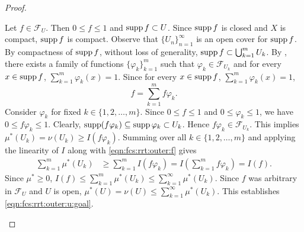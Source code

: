 \begin{proof}
\begin{step}
Let $f \in \mathcal{F}_U$. Then $0 \leq f \leq 1$ and $\operatorname{supp} f \subset U$. Since $\operatorname{supp} f$ is closed and $X$ is compact, $\operatorname{supp} f$ is compact. Observe that $\{ U_n \}_{n = 1}^{\infty}$ is an open cover for $\operatorname{supp} f$. By compactness of $\operatorname{supp} f$, without loss of generality, $\operatorname{supp} f \subset \bigcup_{k=1}^m U_k$.
By , there exists a family of functions $\{ \varphi_k \}_{k=1}^m$ such that $\varphi_k \in \mathcal{F}_{U_k}$ and for every $x \in \operatorname{supp} f$, $\sum_{k=1}^m \varphi_k(x) = 1$. 
Since for every $x \in \operatorname{supp} f$, $\sum_{k=1}^m \varphi_k(x) = 1$, \begin{equation}
    \label{eqn:fcs:rrt:outer:f}
    f = \sum_{k=1}^m f \varphi_k.
\end{equation}
Consider $\varphi_k$ for fixed $k \in \{ 1, 2, \ldots, m \}$.
Since $0 \leq f \leq 1$ and $0 \leq \varphi_k \leq 1$, we have $0 \leq f \varphi_k \leq 1$.
Clearly, $\operatorname{supp}(f \varphi_k) \subseteq \operatorname{supp} \varphi_k \subset U_k$. Hence $f \varphi_k \in \mathcal{F}_{U_k}$. This implies $\mu^{\ast} (U_k) = \nu(U_k) \geq I (f \varphi_k)$. Summing over all $k \in \{ 1, 2, \ldots, m \}$ and applying the linearity of $I$ along with \ref{eqn:fcs:rrt:outer:f} gives
\begin{align*}
    \sum_{k=1}^m \mu^{\ast}(U_k) &\geq \sum_{k = 1}^m I (f \varphi_k) =  I \left (\sum_{k = 1}^m f \varphi_k \right) = I(f).
\end{align*}
Since $\mu^{\ast} \geq 0$, $I(f) \leq \sum_{k=1}^m \mu^{\ast}(U_k) \leq \sum_{k = 1}^\infty \mu^{\ast}(U_k)$. Since $f$ was arbitrary in $\mathcal{F}_U$ and $U$ is open, $\mu^\ast(U) = \nu(U) \leq \sum_{k = 1}^\infty \mu^{\ast}(U_k)$. This establishes \ref{eqn:fcs:rrt:outer:u:goal}.


\end{step}
\end{proof}
